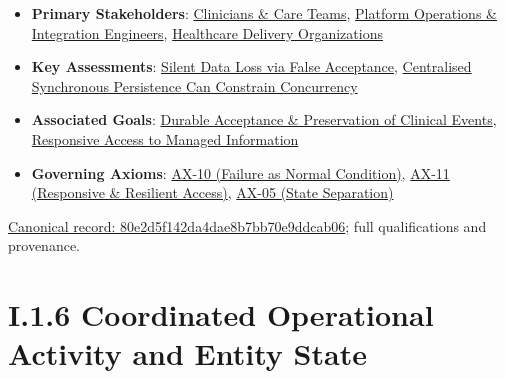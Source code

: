 \begin{itemize}


\item \textbf{Primary Stakeholders}: \href{\detokenize{../../../../../../../../../docs/markdown/01-motivation/stakeholders/enterprise-stakeholders.md}}{Clinicians \& Care Teams}, \href{\detokenize{../../../../../../../../../docs/markdown/01-motivation/stakeholders/enterprise-stakeholders.md}}{Platform Operations \& Integration Engineers}, \href{\detokenize{../../../../../../../../../docs/markdown/01-motivation/stakeholders/enterprise-stakeholders.md}}{Healthcare Delivery Organizations}

\item \textbf{Key Assessments}: \href{\detokenize{../../../../../../../../../docs/markdown/01-motivation/drivers-assessments/assessments.md}}{Silent Data Loss via False Acceptance}, \href{\detokenize{../../../../../../../../../docs/markdown/01-motivation/drivers-assessments/assessments.md}}{Centralised Synchronous Persistence Can Constrain Concurrency}

\item \textbf{Associated Goals}: \href{\detokenize{../../../../../../../../../docs/markdown/01-motivation/goals-outcomes/strategic-goals.md}}{Durable Acceptance \& Preservation of Clinical Events}, \href{\detokenize{../../../../../../../../../docs/markdown/01-motivation/goals-outcomes/strategic-goals.md}}{Responsive Access to Managed Information}

\item \textbf{Governing Axioms}: \hyperref[element:0d9673833eb840eab03804aa076c1b0c]{AX-10 (Failure as Normal Condition)}, \hyperref[element:8a1e995f16954484a78ae1c5c114d546]{AX-11 (Responsive \& Resilient Access)}, \hyperref[element:0412a2084f0145babc4f022c71fea65f]{AX-05 (State Separation)}

\end{itemize}

{\footnotesize \href{../../../../../../../../continuum/motivation/driver/80e2d5f142da4dae8b7bb70e9ddcab06.md}{Canonical record: 80e2d5f142da4dae8b7bb70e9ddcab06}; full qualifications and provenance.}\par
\section*{I.1.6 Coordinated Operational Activity and Entity State}
\label{navigation:I.1.6}

